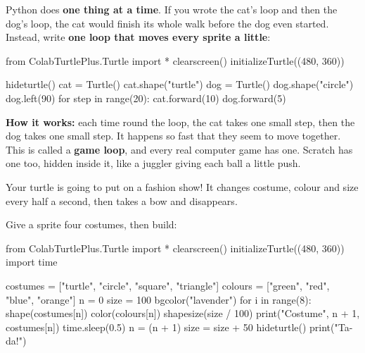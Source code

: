 Python does \textbf{one thing at a time}. If you wrote the cat's loop and then the dog's loop, the cat would finish its whole walk before the dog even started. Instead, write \textbf{one loop that moves every sprite a little}:

\begin{typethis}
from ColabTurtlePlus.Turtle import *
clearscreen()
initializeTurtle((480, 360))

hideturtle()
cat = Turtle()
cat.shape("turtle")
dog = Turtle()
dog.shape("circle")
dog.left(90)
for step in range(20):
    cat.forward(10)
    dog.forward(5)
\end{typethis}

\textbf{How it works:} each time round the loop, the cat takes one small step, then the dog takes one small step. It happens so fast that they seem to move together. This is called a \textbf{game loop}, and every real computer game has one. Scratch has one too, hidden inside it, like a juggler giving each ball a little push.



Your turtle is going to put on a fashion show! It changes costume, colour and size every half a second, then takes a bow and disappears.

Give a sprite four costumes, then build:

\begin{center}
\begin{scratch}
\end{scratch}
\end{center}


\begin{typethis}
from ColabTurtlePlus.Turtle import *
clearscreen()
initializeTurtle((480, 360))
import time

costumes = ["turtle", "circle", "square", "triangle"]
colours = ["green", "red", "blue", "orange"]
n = 0
size = 100
bgcolor("lavender")
for i in range(8):
    shape(costumes[n])
    color(colours[n])
    shapesize(size / 100)
    print("Costume", n + 1, costumes[n])
    time.sleep(0.5)
    n = (n + 1) %
    size = size + 50
hideturtle()
print("Ta-da!")
\end{typethis}

